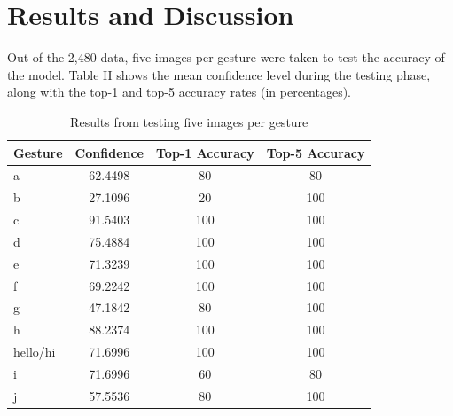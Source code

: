 \documentclass[journal]{./IEEE/IEEEtran}
\begin{document}
\section{Results and Discussion}

Out of the 2,480 data, five images per gesture were taken to test the accuracy of the model. Table II shows the mean confidence level during the testing phase, along with the top-1 and top-5 accuracy rates (in percentages).

\begin{table}[ht!]
\centering
\caption{Results from testing five images per gesture}
\begin{tabular}{|l|c|c|c|}
\hline
\multicolumn{1}{|c|}{\textbf{Gesture}} & \textbf{Confidence} & \textbf{Top-1 Accuracy} & \textbf{Top-5 Accuracy} \\ \hline
a                                      & 62.4498                   & 80                      & 80                      \\ \hline
b                                      & 27.1096                   & 20                      & 100                     \\ \hline
c                                      & 91.5403                   & 100                     & 100                     \\ \hline
d                                      & 75.4884                   & 100                     & 100                     \\ \hline
e                                      & 71.3239                   & 100                     & 100                     \\ \hline
f                                      & 69.2242                   & 100                     & 100                     \\ \hline
g                                      & 47.1842                   & 80                      & 100                     \\ \hline
h                                      & 88.2374                   & 100                     & 100                     \\ \hline
hello/hi                             & 71.6996                   & 100                     & 100                     \\ \hline
i                                      & 71.6996                   & 60                      & 80                      \\ \hline
j                                      & 57.5536                   & 80                      & 100                     \\ \hline

\end{tabular}
\end{table}
\end{document}
